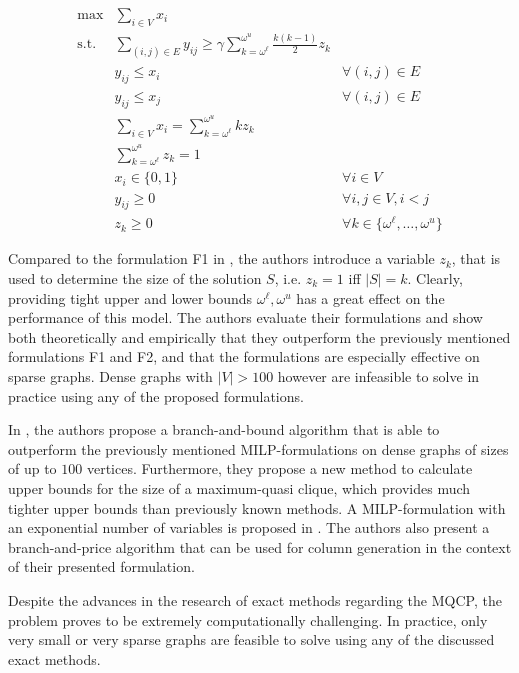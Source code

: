 \documentclass[draft,final]{vutinfth} %
\begin{document}
\begin{align}
    \max & \sum_{i \in V} x_i \\
    \text{s.t.} & \sum_{(i,j) \in E} y_{ij} \geq \gamma \sum_{k = \omega^{\ell}}^{\omega^u} \frac{k(k-1)}{2} z_k \\
    & y_{ij} \leq x_i & \forall(i,j) \in E \\
    & y_{ij} \leq x_j & \forall(i,j) \in E \\
    & \sum_{i \in V} x_i = \sum_{k = \omega^{\ell}}^{\omega^u} k z_k & \\
    & \sum_{k = \omega^{\ell}}^{\omega^u} z_k = 1 \\
    & x_i \in \{0,1\} & \forall i \in V \\
    & y_{ij} \geq 0 & \forall i, j \in V, i < j\\
    & z_k \geq 0 & \forall k \in \{\omega^{\ell}, \dots, \omega^u\}
\end{align}

Compared to the formulation F1 in \cite{pattillo_maximum_2013}, the authors introduce a variable $z_k$, that is used to determine the size of the solution $S$, i.e. $z_k = 1$ iff $|S| = k$. Clearly, providing tight upper and lower bounds $\omega^{\ell}, \omega^u$ has a great effect on the performance of this model. The authors evaluate their formulations and show both theoretically and empirically that they outperform the previously mentioned formulations F1 and F2, and that the formulations are especially effective on sparse graphs. Dense graphs with $|V| > 100$ however are infeasible to solve in practice using any of the proposed formulations. 

In \cite{ribeiro_exact_2019}, the authors propose a branch-and-bound algorithm that is able to outperform the previously mentioned MILP-formulations on dense graphs of sizes of up to $100$ vertices. Furthermore, they propose a new method to calculate upper bounds for the size of a maximum-quasi clique, which provides much tighter upper bounds than previously known methods. A MILP-formulation with an exponential number of variables is proposed in \cite{marinelli_lp-based_2021}. The authors also present a branch-and-price algorithm that can be used for column generation in the context of their presented formulation. 

Despite the advances in the research of exact methods regarding the MQCP, the problem proves to be extremely computationally challenging. In practice, only very small or very sparse graphs are feasible to solve using any of the discussed exact methods. 
\end{document}
